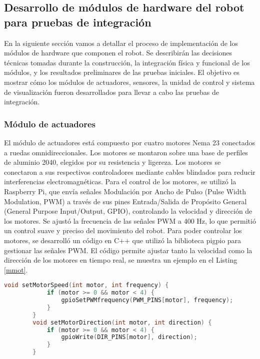 \subsection{Desarrollo de m\'odulos de hardware del robot para pruebas de integraci\'on}
\label{sec:Desarrollo de m\'odulos de hardware del robot para pruebas de integraci\'on}
    En la siguiente secci\'on vamos a detallar el proceso de implementaci\'on de los m\'odulos
        de hardware que componen el robot. Se describir\'an las decisiones t\'ecnicas tomadas
        durante la construcci\'on, la integraci\'on f\'isica y funcional de los m\'odulos, y los
        resultados preliminares de las pruebas iniciales. El objetivo es mostrar c\'omo los
        m\'odulos de actuadores, sensores, la unidad de control y sistema de visualizaci\'on
        fueron desarrollados para llevar a cabo las pruebas de integraci\'on.
    \vskip 0.5cm
    \subsubsection{M\'odulo de actuadores}
    El m\'odulo de actuadores est\'a compuesto por cuatro motores Nema 23 conectados a
        ruedas omnidireccionales. Los motores se montaron sobre una base de perfiles de
        aluminio 2040, elegidos por su resistencia y ligereza. Los motores se conectaron a sus
        respectivos controladores mediante cables blindados para reducir interferencias
        electromagn\'eticas.
    \vskip 0.5cm
    Para el control de los motores, se utiliz\'o la Raspberry Pi, que env\'ia se\~nales Modulaci\'on por Ancho de Pulso (Pulse Width Modulation, PWM) a
        trav\'es de sus pines Entrada/Salida de Prop\'osito General (General Purpose Input/Output, GPIO), controlando la velocidad y direcci\'on de los motores. Se
        ajust\'o la frecuencia de las se\~nales PWM a 400 Hz, lo que permiti\'o un control suave y
        preciso del movimiento del robot.
    \vskip 0.5cm
    Para poder controlar los motores, se desarroll\'o un c\'odigo en C++ que utiliz\'o la
        biblioteca pigpio para gestionar las se\~nales PWM. El c\'odigo permite ajustar tanto la
        velocidad como la direcci\'on de los motores en tiempo real, se muestra un ejemplo en el
        Listing \ref{mmot}.
    \vskip 0.5cm
    \begin{lstlisting}[language={C++}, caption={C\'odigo de ejemplo de motores}, label={mmot}]
        void setMotorSpeed(int motor, int frequency) {
            if (motor >= 0 && motor < 4) {
                gpioSetPWMfrequency(PWM_PINS[motor], frequency);
            }
        }
        void setMotorDirection(int motor, int direction) {
            if (motor >= 0 && motor < 4) {
                gpioWrite(DIR_PINS[motor], direction);
            }
        }
    \end{lstlisting}
    \vskip 0.5cm
